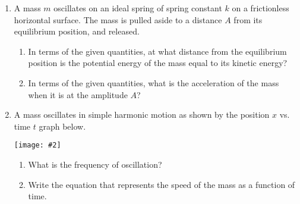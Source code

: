 \documentclass[12pt]{article}
\newcommand{\pic}[2]{\texttt{[image: \#2]}}
\begin{document}
\begin{enumerate}[leftmargin=15pt]

\item A mass $m$ oscillates on an ideal spring of spring constant $k$ on a
  frictionless horizontal surface. The mass is pulled aside to a distance $A$
  from its equilibrium position, and released.
  \begin{center}
  \end{center} 
  \begin{enumerate}[noitemsep]  
  \item In terms of the given quantities, at what distance from the equilibrium
    position is the potential energy of the mass equal to its kinetic energy?
  \item In terms of the given quantities, what is the acceleration of the mass
    when it is at the amplitude $A$?
  \end{enumerate}
  \newpage
  
\item A mass oscillates in simple harmonic motion as shown by the position $x$
  vs. time $t$ graph below.
  \begin{center}
    \pic{.45}{oscillate.png}
  \end{center}
  \begin{enumerate}[noitemsep]  
  \item What is the frequency of oscillation?
  \item Write the equation that represents the speed of the mass as a function
    of time.
  \end{enumerate}
  \newpage


\end{enumerate}
\end{document}
